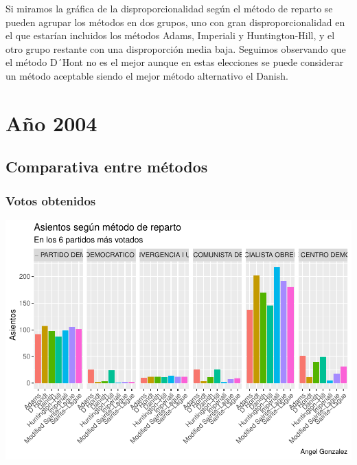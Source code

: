 \documentclass[12pt,a4paper,]{book}
\numberwithin{dummy}{section}
\theoremstyle{ocrenumbox}
\theoremstyle{blacknumex}
\theoremstyle{blacknumbox}
\theoremstyle{ocrenum}
\theoremstyle{ocrenum}
\begin{document}
Si miramos la gráfica de la disproporcionalidad según el método de
reparto se pueden agrupar los métodos en dos grupos, uno con gran
disproporcionalidad en el que estarían incluidos los métodos Adams,
Imperiali y Huntington-Hill, y el otro grupo restante con una
disproporción media baja. Seguimos observando que el método D´Hont no es
el mejor aunque en estas elecciones se puede considerar un método
aceptable siendo el mejor método alternativo el Danish.

\hypertarget{auxf1o-2004}{%
\section{Año 2004}\label{auxf1o-2004}}

\hypertarget{comparativa-entre-muxe9todos-8}{%
\subsection{Comparativa entre
métodos}\label{comparativa-entre-muxe9todos-8}}

\hypertarget{votos-obtenidos-8}{%
\subsubsection{Votos obtenidos}\label{votos-obtenidos-8}}

\begin{center}\includegraphics[width=0.95\linewidth]{figurasR/unnamed-chunk-83-1} \end{center}
\end{document}
